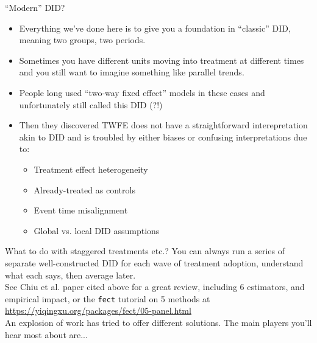 \documentclass[xcolor=dvipsnames]{beamer}
\begin{document}
\begin{frame}{``Modern'' DID?}
\small
\begin{itemize}
\item<1-> Everything we've done here is to give you a foundation in ``classic'' DID, meaning two groups, two periods. 
\item<2-> Sometimes you have different units moving into treatment at different times and you still want to imagine something like parallel trends.
\item<3-> People long used ``two-way fixed effect'' models in these cases and unfortunately still called this DID (?!)
\item<4-> Then they discovered TWFE does not have a straightforward interepretation akin to DID and is troubled by either biases or confusing interpretations due to:
\begin{itemize}
\footnotesize
\item<5-> Treatment effect heterogeneity
\item<6-> Already-treated as controls
\item<7-> Event time misalignment	
\item<8-> Global vs. local DID assumptions 
\end{itemize}
\end{itemize}
\end{frame}


\begin{frame}{What to do with staggered treatments etc.?}
\small
{} You can always run a series of separate well-constructed DID for each wave of treatment adoption, understand what each says, then average later.\\
\bigskip
{} See Chiu et al. paper cited above for a great review, including 6 estimators, and empirical impact, or the \texttt{fect} tutorial on 5 methods at \url{https://yiqingxu.org/packages/fect/05-panel.html} \\
\bigskip
{} An explosion of work has tried to offer different solutions. The main players you'll hear most about are...

\end{frame}
\end{document}
